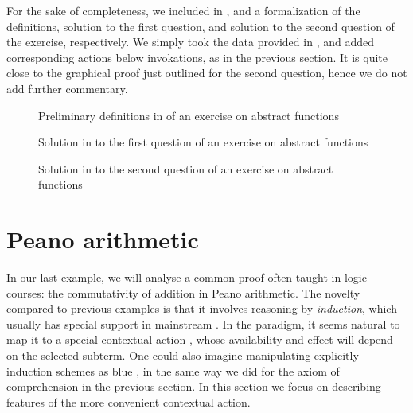 For the sake of completeness, we included in ,
 and  a  formalization of the
definitions, solution to the first question, and solution to the second question
of the exercise, respectively. We simply took the data provided in
\cite{bartzia:hal-04087080}, and added corresponding  actions below 
invokations, as in the previous section. It is quite close to the graphical proof
just outlined for the second question, hence we do not add further commentary.

\begin{figure}
  
  \caption{Preliminary definitions in  of an exercise on abstract functions}
\end{figure}

\begin{figure}
  
  \caption{Solution in  to the first question of an exercise on abstract functions}
\end{figure}

\begin{figure}
  
  \caption{Solution in  to the second question of an exercise on abstract functions}
\end{figure}


\section{Peano arithmetic}

In our last example, we will analyse a common proof often taught in logic
courses: the commutativity of addition in Peano arithmetic. The novelty compared
to previous examples is that it involves reasoning by \emph{induction}, which
usually has special support in mainstream . In the
 paradigm, it seems natural to map it to a special contextual
action , whose availability and effect will depend on the
selected subterm. One could also imagine manipulating explicitly induction
schemes as blue , in the same way we did for the axiom of comprehension in
the previous section. In this section we focus on describing features of the
more convenient contextual action.

